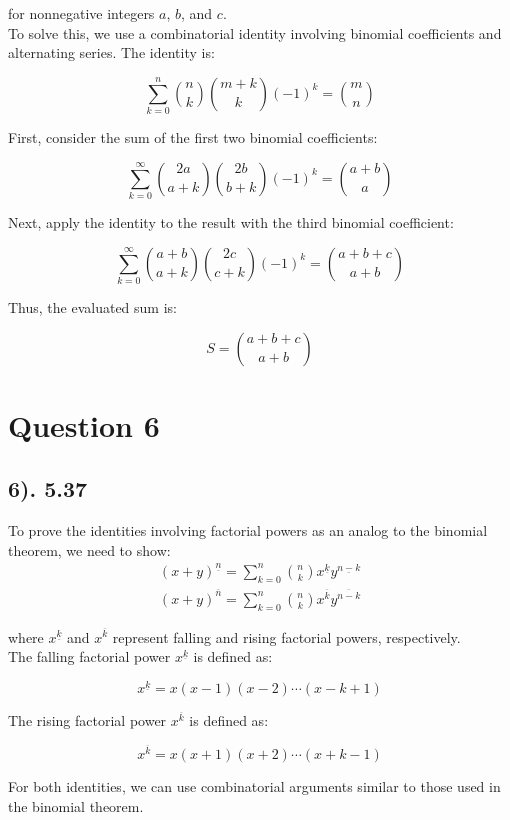 \documentclass[12pt]{article}
\begin{document}
for nonnegative integers \(a\), \(b\), and \(c\). \\

To solve this, we use a combinatorial identity involving binomial coefficients and alternating series. The identity is:

\[
\sum_{k=0}^{n} \binom{n}{k} \binom{m+k}{k} (-1)^k = \binom{m}{n}
\]

First, consider the sum of the first two binomial coefficients:

\[
\sum_{k=0}^{\infty} \binom{2a}{a+k} \binom{2b}{b+k} (-1)^k = \binom{a+b}{a}
\]

Next, apply the identity to the result with the third binomial coefficient:

\[
\sum_{k=0}^{\infty} \binom{a+b}{a+k} \binom{2c}{c+k} (-1)^k = \binom{a+b+c}{a+b}
\]

Thus, the evaluated sum is:

\[
S = \binom{a+b+c}{a+b}
\]

\section*{Question 6}
\subsection*{6). 5.37}
To prove the identities involving factorial powers as an analog to the binomial theorem, we need to show:
\begin{gather*}
(x + y)^{\underline{n}} = \sum_{k=0}^{n} \binom{n}{k} x^{\underline{k}} y^{\underline{n-k}} \\
(x + y)^{\overline{n}} = \sum_{k=0}^{n} \binom{n}{k} x^{\overline{k}} y^{\overline{n-k}}
\end{gather*}

where \(x^{\underline{k}}\) and \(x^{\overline{k}}\) represent falling and rising factorial powers, respectively. \\

The falling factorial power \(x^{\underline{k}}\) is defined as:

\[ x^{\underline{k}} = x (x - 1) (x - 2) \cdots (x - k + 1) \]

The rising factorial power \(x^{\overline{k}}\) is defined as:

\[ x^{\overline{k}} = x (x + 1) (x + 2) \cdots (x + k - 1) \]

For both identities, we can use combinatorial arguments similar to those used in the binomial theorem. \\
\end{document}
